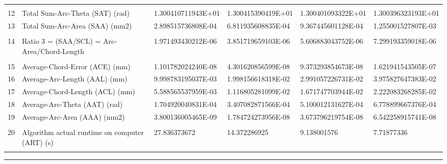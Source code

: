 \begin{landscape}
\begin{table}[ht]
{\begin{tabular}{ p{0.2cm} p{8.80cm} p{4.00cm} p{4.0cm} p{4.00cm} p{4.0cm}}
&		&		&		&		&		\\
12	&	Total Sum-Arc-Theta (SAT) (rad)	&	1.300410711943E+01	&	1.300415390419E+01	&	1.300401093322E+01	&	1.300396323193E+01	\\
13	&	Total Sum-Arc-Area (SAA) (mm2)	&	2.898515736808E-04	&	6.811935608835E-04	&	9.367445601128E-04	&	1.255001527807E-03	\\
&		&		&		&		&		\\
14	&	Ratio 3 = (SAA/SCL) = Arc-Area/Chord-Length	&	1.971493430212E-06	&	3.851719659103E-06	&	5.606883043752E-06	&	7.299193359018E-06	\\
&		&		&		&		&		\\
15	&	Average-Chord-Error (ACE) (mm)	&	1.101782024240E-08	&	4.301620856599E-08	&	9.373293854673E-08	&	1.621941543505E-07	\\
16	&	Average-Arc-Length (AAL) (mm)	&	9.998783195037E-03	&	1.998156618318E-02	&	2.991057226731E-02	&	3.975827647383E-02	\\
17	&	Average-Chord-Length (ACL) (mm)	&	5.588565537959E-03	&	1.116805281099E-02	&	1.671747703944E-02	&	2.222083268285E-02	\\
18	&	Average-Arc-Theta (AAT) (rad)	&	1.704920040831E-04	&	3.407082871566E-04	&	5.100012131627E-04	&	6.778899667376E-04	\\
19	&	Average-Arc-Area (AAA) (mm2)	&	3.800136005465E-09	&	1.784724273956E-08	&	3.673796219754E-08	&	6.542258915741E-08	\\
&		&		&		&		&		\\
20	&	Algorithm actual runtime on computer (ART) (s) 	&	27.836373672	&	14.372286925	&	9.138001576	&	7.71877336	\\
&		&		&		&		&		

\end{tabular}
			
}   %
\hrule
\end{table}
\end{landscape}


